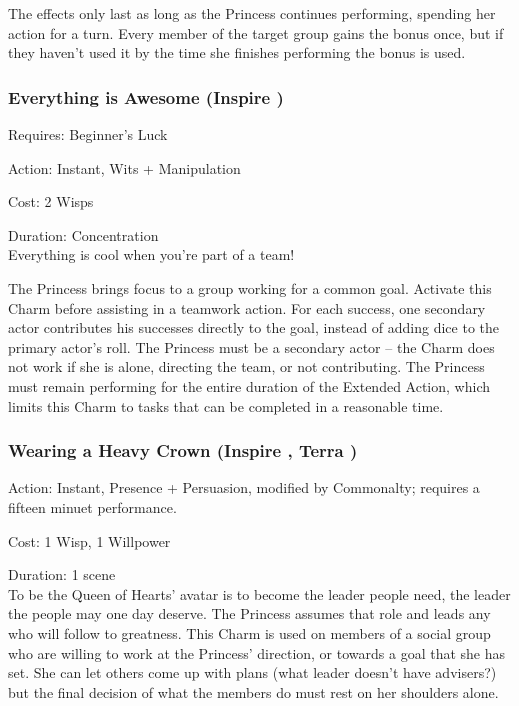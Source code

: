 The effects only last as long as the Princess continues performing, spending her action for a turn. Every member of the target group gains the bonus once, but if they haven't used it by the time she finishes performing the bonus is used.

\subsubsection*{Everything is Awesome (Inspire \textbullet\textbullet\textbullet\textbullet\textbullet)}

\noindent Requires: Beginner's Luck

\noindent Action: Instant, Wits + Manipulation

\noindent Cost: 2 Wisps

\noindent Duration: Concentration \\ 

\noindent  Everything is cool when you're part of a team!

The Princess brings focus to a group working for a common goal. Activate this Charm before assisting in a teamwork action. For each success, one secondary actor contributes his successes directly to the goal, instead of adding dice to the primary actor's roll. The Princess must be a secondary actor -- the Charm does not work if she is alone, directing the team, or not contributing. The Princess must remain performing for the entire duration of the Extended Action, which limits this Charm to tasks that can be completed in a reasonable time.  

\subsubsection*{Wearing a Heavy Crown (Inspire \textbullet\textbullet\textbullet\textbullet\textbullet, Terra \textbullet\textbullet\textbullet\textbullet)}

\noindent Action: Instant, Presence + Persuasion, modified by Commonalty; requires a fifteen minuet performance.

\noindent Cost: 1 Wisp, 1 Willpower

\noindent Duration: 1 scene \\

\noindent To be the Queen of Hearts' avatar is to become the leader people need, the leader the people may one day deserve. The Princess assumes that role and leads any who will follow to greatness. This Charm is used on members of a social group who are willing to work at the Princess' direction, or towards a goal that she has set. She can let others come up with plans (what leader doesn’t have advisers?) but the final decision of what the members do must rest on her shoulders alone.

